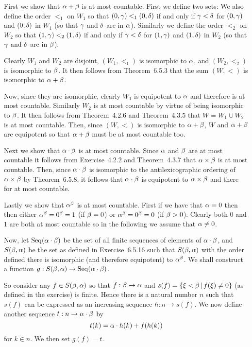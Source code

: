 
\begin{solution}
  First we show that $\alpha + \beta$ is at most countable.
  First we define two sets:
  We also define the order $<_1$ on $W_1$ so that $(0,\gamma) <_1 (0,\delta)$ if and only if $\gamma < \delta$ for $(0, \gamma)$ and $(0, \delta)$ in $W_1$ (so that $\gamma$ and $\delta$ are in $\alpha$).
  Similarly we define the order $<_2$ on $W_2$ so that $(1,\gamma) <_2 (1,\delta)$ if and only if $\gamma < \delta$ for $(1, \gamma)$ and $(1, \delta)$ in $W_2$ (so that $\gamma$ and $\delta$ are in $\beta$).

  Clearly $W_1$ and $W_2$ are disjoint, $(W_1, <_1)$ is isomorphic to $\alpha$, and $(W_2, <_2)$ is isomorphic to $\beta$.
  It then follows from Theorem~6.5.3 that the sum $(W, <)$ is isomorphic to $\alpha + \beta$.

  Now, since they are isomorphic, clearly $W_1$ is equipotent to $\alpha$ and therefore is at most countable.
  Similarly $W_2$ is at most countable by virtue of being isomorphic to $\beta$.
  It then follows from Theorem~4.2.6 and Theorem~4.3.5 that $W = W_1 \cup W_2$ is at most countable.
  Then, since $(W, <)$ is isomorphic to $\alpha + \beta$, $W$ and $\alpha + \beta$ are equipotent so that $\alpha + \beta$ must be at most countable too. \qedsymbol

  Next we show that $\alpha \cdot \beta$ is at most countable.
  Since $\alpha$ and $\beta$ are at most countable it follows from Exercise~4.2.2 and Theorem~4.3.7 that $\alpha \times \beta$ is at most countable.
  Then, since $\alpha \cdot \beta$ is isomorphic to the antilexicographic ordering of $\alpha \times \beta$ by Theorem~6.5.8, it follows that $\alpha \cdot \beta$ is equipotent to $\alpha \times \beta$ and there for at most countable. \qedsymbol

  Lastly we show that $\alpha^\beta$ is at most countable.
  First if we have that $\alpha = 0$ then then either $\alpha^\beta = 0^\beta = 1$ (if $\beta = 0$) or $\alpha^\beta = 0^\beta = 0$ (if $\beta > 0$).
  Clearly both $0$ and $1$ are both at most countable so in the following we assume that $\alpha \neq 0$.

  \def\seqab{\Seq(\a \cdot \b)}
  \def\sba{S(\b, \a)}
  Now, let $\seqab$ be the set of all finite sequences of elements of $\alpha \cdot \beta$, and $\sba$ be the set as defined in Exercise~6.5.16 such that $\sba$ with the order defined there is isomorphic (and therefore equipotent) to $\alpha^\beta$.
  We shall construct a function $g: \sba \to \seqab$.

  So consider any $f \in \sba$ so that $f:\beta \to \alpha$ and $s(f) = \left\{ \xi < \beta \,|\, f(\xi) \neq 0 \right\}$ (as defined in the exercise) is finite.
  Hence there is a natural number $n$ such that $s(f)$ can be expressed as an increasing sequence $h: n \to s(f)$.
  We now define another sequence $t: n \to \alpha \cdot \beta$ by
  $$
  t(k) = \alpha \cdot h(k) + f(h(k))
  $$
  for $k \in n$.
  We then set $g(f) = t$.


\end{solution}
